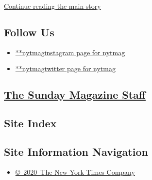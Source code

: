 \protect\hyperlink{after-mktg}{Continue reading the main story}

\hypertarget{follow-us}{%
\subsection{Follow Us}\label{follow-us}}

\begin{itemize}
\tightlist
\item
  \href{https://instagram.com/nytmag}{**nytmaginstagram page for nytmag}
\item
  \href{https://twitter.com/nytmag}{**nytmagtwitter page for nytmag}
\end{itemize}

\subsection{}

\hypertarget{the-sunday-magazine-staff}{%
\subsection{\texorpdfstring{\href{\%0Ahttps://www.nytimes.com/interactive/magazine/masthead.html}{The
Sunday Magazine
Staff}}{The Sunday Magazine Staff}}\label{the-sunday-magazine-staff}}

\hypertarget{site-index}{%
\subsection{Site Index}\label{site-index}}

\hypertarget{site-information-navigation}{%
\subsection{Site Information
Navigation}\label{site-information-navigation}}

\begin{itemize}
\tightlist
\item
  \href{https://help.nytimes.com/hc/en-us/articles/115014792127-Copyright-notice}{©~2020~The
  New York Times Company}
\end{itemize}

